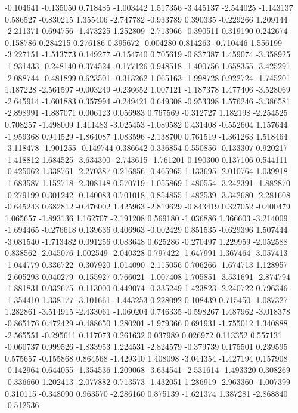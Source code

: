 -0.104641
-0.135050
0.718485
-1.003442
1.517356
-3.445137
-2.544025
-1.143137
0.586527
-0.830215
1.355406
-2.747782
-0.933789
0.390335
-0.229266
1.209144
-2.211371
0.694756
-1.473225
1.252809
-2.713966
-0.390511
0.319190
0.242674
0.158786
0.284215
0.276186
0.395672
-0.004280
0.814263
-0.710446
1.556199
-3.227151
-1.513773
0.149277
-0.154740
0.705619
-0.837387
1.459074
-3.358925
-1.931433
-0.248140
0.374524
-0.177126
0.948518
-1.400756
1.658355
-3.425291
-2.088744
-0.481899
0.623501
-0.313262
1.065163
-1.998728
0.922724
-1.745201
1.187228
-2.561597
-0.003249
-0.236652
1.007121
-1.187378
1.477406
-3.528069
-2.645914
-1.601883
0.357994
-0.249421
0.649308
-0.953398
1.576246
-3.386581
-2.898991
-1.887071
0.006123
0.056983
0.767569
-0.312727
1.182198
-2.254525
0.708257
-1.498009
1.411483
-3.025453
-1.089582
0.431408
-0.552604
1.157644
-1.959368
0.944529
-1.864087
1.083596
-2.138700
0.761519
-1.361263
1.518464
-3.118478
-1.901255
-0.149744
0.386642
0.336854
0.550856
-0.133307
0.920217
-1.418812
1.684525
-3.634300
-2.743615
-1.761201
0.190300
0.137106
0.544111
-0.425062
1.338761
-2.270387
0.216856
-0.465965
1.133695
-2.010764
1.039918
-1.683587
1.152718
-2.308148
0.570719
-1.055869
1.480554
-3.242391
-1.882870
-0.279199
0.301242
-0.140083
0.701018
-0.854855
1.482539
-3.342680
-2.281608
-0.645243
0.682812
-0.476002
1.425963
-2.819629
-0.843419
0.327052
-0.400479
1.065657
-1.893136
1.162707
-2.191208
0.569180
-1.036886
1.366603
-3.214009
-1.694465
-0.276618
0.139636
0.406963
-0.002429
0.851535
-0.629396
1.507444
-3.081540
-1.713482
0.091256
0.083648
0.625286
-0.270497
1.229959
-2.052588
0.838562
-2.045076
1.002549
-2.040328
0.797422
-1.647991
1.367464
-3.057413
-1.044779
0.336722
-0.307920
1.014090
-2.115056
0.706266
-1.674713
1.128957
-2.605293
0.040279
-0.155927
0.766021
-1.007408
1.705851
-3.531691
-2.874794
-1.881831
0.032675
-0.113000
0.449074
-0.335249
1.423823
-2.240722
0.796346
-1.354410
1.338177
-3.101661
-1.443253
0.228092
0.108439
0.715450
-1.087327
1.282861
-3.514915
-2.433061
-1.060204
0.746335
-0.598267
1.487962
-3.018378
-0.865176
0.472429
-0.488650
1.280201
-1.979366
0.691931
-1.755012
1.340888
-2.565551
-0.295611
0.117073
0.261632
0.037989
0.026972
0.113352
0.557131
-0.060737
0.999526
-1.833953
1.224531
-2.824579
-0.379739
0.175501
0.239595
0.575657
-0.155868
0.864568
-1.429340
1.408098
-3.044354
-1.427194
0.157908
-0.142964
0.644055
-1.354536
1.209068
-3.634541
-2.531614
-1.493320
0.308269
-0.336660
1.202413
-2.077882
0.713573
-1.432051
1.286919
-2.963360
-1.007399
0.310115
-0.348090
0.963570
-2.286160
0.875139
-1.621374
1.387281
-2.868840
-0.512536
